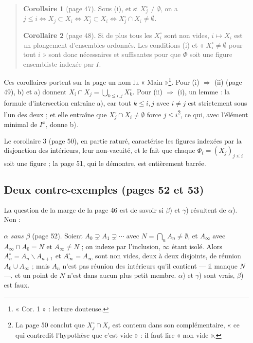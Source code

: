 \documentclass[11pt,a4paper]{article}
\begin{document}
\begin{quote}
\textbf{Corollaire 1} (page 47). Sous (i), et si $X_{j}^{\circ} \neq
\emptyset$, on a $j \leq i \iff X_{j} \subset X_{i} \iff X_{j}^{\circ} \subset
X_{i} \iff X_{j}^{\circ} \cap X_{i} \neq \emptyset$.

\textbf{Corollaire 2} (page 48). Si de plus tous les $X_{i}^{\circ}$ sont non
vides, $i \mapsto X_{i}$ est un plongement d'ensembles ordonnés. Les conditions
(i) et « $X_{i}^{\circ} \neq \emptyset$ pour tout $i$ » sont donc nécessaires
et suffisantes pour que $\Phi$ soit une figure ensembliste indexée par $I$.
\end{quote}

Ces corollaires portent sur la page un nom lu « Main »\footnote{« Cor.
 1 » : lecture douteuse.}. Pour (i) $\Rightarrow$ (ii) (page 49),
b) et a) donnent $X_{i} \cap X_{j} = \bigcup_{k \leq i,j} X_{k}^{\circ}$. Pour
(ii) $\Rightarrow$ (i), un lemme : la formule d'intersection entraîne a), car
tout $k \leq i, j$ avec $i \neq j$ est strictement sous l'un des deux ; et elle
entraîne que $X_{j}^{\circ} \cap X_{i} \neq \emptyset$ force $j \leq
i$\footnote{La page 50 conclut que $X_{j}^{\circ} \cap X_{i}$ est contenu dans
son complémentaire, « ce qui contredit l'hypothèse que c'est vide » : il faut
lire « non vide ».}, ce qui, avec l'élément minimal de $I^{x}$, donne b).

Le corollaire 3 (page 50), en partie raturé, caractérise les figures indexées
par la disjonction des intérieurs, leur non-vacuité, et le fait que chaque
$\Phi_{i} = (X_{j})_{j \leq i}$ soit une figure ; la page 51, qui le démontre,
est entièrement barrée.

\subsection*{Deux contre-exemples (pages 52 et 53)}

La question de la marge de la page 46 est de savoir si $\beta$) et $\gamma$)
résultent de $\alpha$). Non :

\emph{$\alpha$ sans $\beta$} (page 52). Soient $A_{0} \supsetneq A_{1}
\supsetneq \cdots$ avec $N = \bigcap_{n} A_{n} \neq \emptyset$, et $A_{\infty}$
avec $A_{\infty} \cap A_{0} = N$ et $A_{\infty} \neq N$ ; on indexe par
l'inclusion, $\infty$ étant isolé. Alors $A_{n}^{\circ} = A_{n} \smallsetminus
A_{n+1}$ et $A_{\infty}^{\circ} = A_{\infty}$ sont non vides, deux à deux
disjoints, de réunion $A_{0} \cup A_{\infty}$ ; mais $A_{n}$ n'est pas réunion
des intérieurs qu'il contient --- il manque $N$ ---, et un point de $N$ n'est
dans aucun plus petit membre. $\alpha$) et $\gamma$) sont vrais, $\beta$) est
faux.
\end{document}

